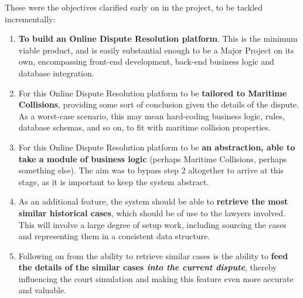These were the objectives clarified early on in the project, to be tackled incrementally:

\begin{enumerate}

    \item \textbf{To build an Online Dispute Resolution platform}. This is the minimum viable product, and is easily substantial enough to be a Major Project on its own, encompassing front-end development, back-end business logic and database integration.

    \item For this Online Dispute Resolution platform to be \textbf{tailored to Maritime Collisions}, providing some sort of conclusion given the details of the dispute. As a worst-case scenario, this may mean hard-coding business logic, rules, database schemas, and so on, to fit with maritime collision properties.

    \item For this Online Dispute Resolution platform to be \textbf{an abstraction, able to take a module of business logic} (perhaps Maritime Collisions, perhaps something else). The aim was to bypass step 2 altogether to arrive at this stage, as it is important to keep the system abstract.

    \item As an additional feature, the system should be able to \textbf{retrieve the most similar historical cases}, which should be of use to the lawyers involved. This will involve a large degree of setup work, including sourcing the cases and representing them in a consistent data structure.

    \item Following on from the ability to retrieve similar cases is the ability to \textbf{feed the details of the similar cases \emph{into the current dispute}}, thereby influencing the court simulation and making this feature even more accurate and valuable.

\end{enumerate}